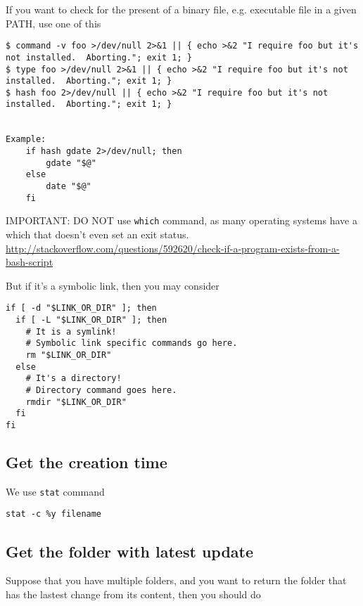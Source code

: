 If you want to check for the present of a binary file, e.g. executable file in a
given PATH, use one of this
\begin{verbatim}
$ command -v foo >/dev/null 2>&1 || { echo >&2 "I require foo but it's not installed.  Aborting."; exit 1; }
$ type foo >/dev/null 2>&1 || { echo >&2 "I require foo but it's not installed.  Aborting."; exit 1; }
$ hash foo 2>/dev/null || { echo >&2 "I require foo but it's not installed.  Aborting."; exit 1; }


Example:
    if hash gdate 2>/dev/null; then
        gdate "$@"
    else
        date "$@"
    fi
\end{verbatim}
IMPORTANT: DO NOT use \verb!which! command, as many operating systems have a
which that doesn't even set an exit status.
\url{http://stackoverflow.com/questions/592620/check-if-a-program-exists-from-a-bash-script}

But if it's a symbolic link, then you may consider
\begin{verbatim}
if [ -d "$LINK_OR_DIR" ]; then 
  if [ -L "$LINK_OR_DIR" ]; then
    # It is a symlink!
    # Symbolic link specific commands go here.
    rm "$LINK_OR_DIR"
  else
    # It's a directory!
    # Directory command goes here.
    rmdir "$LINK_OR_DIR"
  fi
fi
\end{verbatim}

\subsection{Get the creation time}

We use \verb!stat! command
\begin{verbatim}
stat -c %y filename
\end{verbatim}

\subsection{Get the folder with latest update}

Suppose that you have multiple folders, and you want to return the folder that
has the lastest change from its content, then you should do

